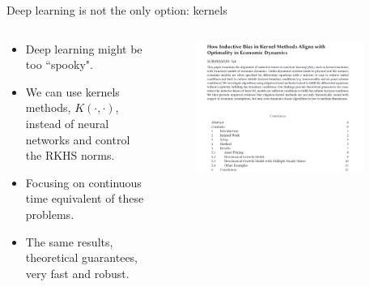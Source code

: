 \documentclass[aspectratio=169,10pt]{beamer}
\begin{document}
\begin{frame}{Deep learning is not the only option: kernels}
\begin{columns}
	\begin{column}{0.5\textwidth}
			\begin{itemize}
			\item Deep learning might be too ``spooky".
			\smallskip
			\item We can use kernels methods, $K(\cdot,\cdot)$, instead of neural networks and control the RKHS norms.
			\item Focusing on continuous time equivalent of these problems.  
			\item The same results, theoretical guarantees, very fast and robust.
		\end{itemize}
	\end{column}
	\begin{column}{0.5\textwidth}
		\begin{figure}[t!]
			\centering
			\includegraphics[width=0.9\textwidth]{figs/Kernel}
			\vspace{-7mm}
		\end{figure}
	\end{column}
\end{columns}

\end{frame}
\end{document}
